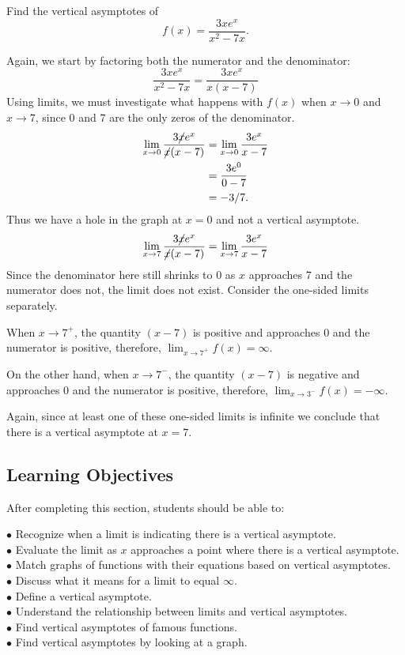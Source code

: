\documentclass{ximera}
\begin{document}
\begin{example}
Find the vertical asymptotes of 
\[
f(x) = \frac{3xe^x}{x^2-7x}.
\]

\begin{explanation}
Again, we start by factoring both the numerator and the denominator:
\[
\frac{3xe^x}{x^2-7x} = \frac{3xe^x}{x(x-7)}
\]
Using limits, we must investigate what happens with $ f(x)$ when $x\to 0$ and $x\to 7$, since $0$ and $7$ are the only zeros of the denominator. 
\begin{align*}
\lim_{x\to 0} \frac{3\cancel{x}e^x}{\cancel{x}(x-7)} &= \lim_{x\to 0} \frac{3e^x}{x-7}\\
&= \frac{3e^0}{0-7}\\
&=-3/7.
\end{align*}
Thus we have a hole in the graph at $x=0$ and not a vertical asymptote.
\begin{align*}
\lim_{x\to 7} \frac{3\cancel{x}e^x}{\cancel{x}(x-7)} &= \lim_{x\to 7} \frac{3e^x}{x-7}\\
\end{align*}
Since the denominator here still shrinks to $0$ as $x$ approaches $7$ and the numerator does not, the limit does not exist. Consider the one-sided limits separately. 

 When $x\to 7^+$, the quantity $
(x-7)$ is positive and approaches $0$ and the numerator is positive, therefore, 
$\lim_{x\to 7^+} f(x) = \infty$.

 On the other hand,  when $x\to 7^-$, the quantity $
(x-7)$ is negative and approaches $0$ and the numerator is positive, therefore, 
$\lim_{x\to 3^-} f(x) = -\infty$.

Again, since at least one of these one-sided limits is infinite we conclude that there is a vertical asymptote at $x=7$.

\end{explanation}
\end{example}
\subsection{Learning Objectives}
After completing this section, students should be able to:
\vspace{.05in}

\noindent$\bullet$ Recognize when a limit is indicating there is a vertical asymptote.
\\$\bullet$ Evaluate the limit as $x$ approaches a point where there is a vertical asymptote.
\\$\bullet$ Match graphs of functions with their equations based on vertical asymptotes.
\\$\bullet$ Discuss what it means for a limit to equal $\infty$.
\\$\bullet$ Define a vertical asymptote.
\\$\bullet$ Understand the relationship between limits and vertical asymptotes.
\\$\bullet$ Find vertical asymptotes of famous functions.
\\$\bullet$ Find vertical asymptotes by looking at a graph.
\end{document}
